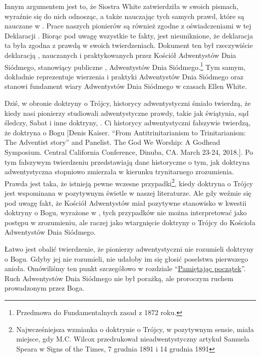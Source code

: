 Innym argumentem jest to, że Siostra White zatwierdziła  w swoich pismach, wyraźnie się do nich odnosząc, a także nauczając tych samych prawd, które są nauczane w . Prace naszych pionierów są również zgodne z oświadczeniami w tej Deklaracji . Biorąc pod uwagę wszystkie te fakty, jest nieuniknione, że deklaracja ta była zgodna z prawdą w swoich twierdzeniach. Dokument ten był rzeczywiście deklaracją , nauczanych i praktykowanych przez Kościół Adwentystów Dnia Siódmego, stanowiący publiczne ,  Adwentystów Dnia Siódmego.\footnote{Przedmowa do Fundamentalnych zasad z 1872 roku.} Tym samym, dokładnie reprezentuje wierzenia i praktyki Adwentystów Dnia Siódmego oraz stanowi fundament wiary Adwentystów Dnia Siódmego w czasach Ellen White.

Dziś, w obronie doktryny o Trójcy, historycy adwentystyczni śmiało twierdzą, że kiedy nasi pionierzy studiowali adwentystyczne prawdy, takie jak świątynia, sąd śledczy, Sabat i inne doktryny, . Ci historycy adwentystyczni fałszywie twierdzą, że doktryna o Bogu [Denis Kaiser. “From Antitrinitarianism to Trinitarianism: The Adventist story” and Panelist. The God We Worship: A Godhead Symposium. Central California Conference, Dinuba, CA. March 23-24, 2018.]. Po tym fałszywym twierdzeniu przedstawiają dane historyczne o tym, jak doktryna adwentystyczna stopniowo zmierzała w kierunku trynitarnego zrozumienia. Prawda jest taka, że istnieją pewne wczesne przypadki\footnote{Najwcześniejsza wzmianka o doktrynie o Trójcy, w pozytywnym sensie, miała miejsce, gdy M.C. Wilcox przedrukował nieadwentystyczny artykuł Samuela Speara w Signs of the Times, 7 grudnia 1891 i 14 grudnia 1891}, kiedy doktryna o Trójcy jest wspominana w pozytywnym świetle w naszej literaturze. Ale gdy weźmie się pod uwagę fakt, że Kościół Adwentystów miał pozytywne stanowisko w kwestii doktryny o Bogu, wyrażone w , tych przypadków nie można interpretować jako postępu w zrozumieniu, ale raczej jako wtargnięcie doktryny o Trójcy do Kościoła Adwentystów Dnia Siódmego.

Łatwo jest obalić twierdzenie, że pionierzy adwentystyczni nie rozumieli doktryny o Bogu. Gdyby jej nie rozumieli, nie udałoby im się głosić poselstwa pierwszego anioła. Omówiliśmy ten punkt szczegółowo w rozdziale “\hyperref[chap:remembering-the-beginning]{Pamiętając początek}”. Ruch Adwentystów Dnia Siódmego nie był porażką, ale proroczym ruchem prowadzonym przez Boga.

